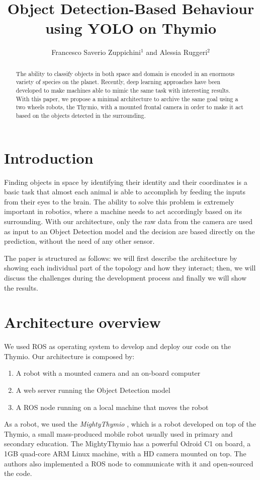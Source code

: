 \documentclass[letterpaper, 10 pt, conference]{ieeeconf}  %
\title{\LARGE \bf
Object Detection-Based Behaviour using YOLO on Thymio
}
\author{Francesco Saverio Zuppichini$^{1}$ and Alessia Ruggeri$^{2}$}%
\begin{document}
\maketitle
\thispagestyle{empty}
\pagestyle{empty}


\begin{abstract}
The ability to classify objects in both space and domain is encoded in an enormous variety of species on the planet. Recently, deep learning approaches have been developed to make machines able to mimic the same task with interesting results. With this paper, we propose a minimal architecture to archive the same goal using a two wheels robots, the Thymio, with a mounted frontal camera in order to make it act based on the objects detected in the surrounding. 
\end{abstract}

\section{Introduction}

Finding objects in space by identifying their identity and their coordinates is a basic task that almost each animal is able to accomplish by feeding the inputs from their eyes to the brain. The ability to solve this problem is extremely important in robotics, where a machine needs to act accordingly based on its surrounding. With our architecture, only the raw data from the camera are used as input to an Object Detection model and the decision are based directly on the prediction, without the need of any other sensor.

The paper is structured as follows: we will first describe the architecture by showing each individual part of the topology and how they interact; then, we will discuss the challenges during the development process and finally we will show the results.

\section{Architecture overview}
We used ROS\cite{ROS} as operating system to develop and deploy our code on the Thymio. Our architecture is composed by:
\begin{enumerate}
	\item A robot with a mounted camera and an on-board computer
	\item A web server running the Object Detection model
	\item A ROS node running on a local machine that moves the robot
\end{enumerate}
As a robot, we used the \emph{MightyThymio} \cite{guzzi2018eaai}, which is a robot developed on top of the Thymio, a small mass-produced mobile robot usually used in primary and secondary education. The MightyThymio has a powerful Odroid C1 on board, a 1GB quad-core ARM Linux machine, with a HD camera mounted on top. The authors also implemented a ROS node to communicate with it and open-sourced the code.
\end{document}
